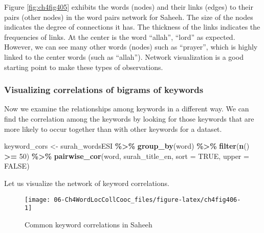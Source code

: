 \documentclass[
]{article}
\newenvironment{Shaded}{\begin{snugshade}}{\end{snugshade}}
\newcommand{\AttributeTok}[1]{\textcolor[rgb]{0.13,0.29,0.53}{#1}}
\newcommand{\ConstantTok}[1]{\textcolor[rgb]{0.56,0.35,0.01}{#1}}
\newcommand{\DecValTok}[1]{\textcolor[rgb]{0.00,0.00,0.81}{#1}}
\newcommand{\FunctionTok}[1]{\textcolor[rgb]{0.13,0.29,0.53}{\textbf{#1}}}
\newcommand{\NormalTok}[1]{#1}
\newcommand{\OtherTok}[1]{\textcolor[rgb]{0.56,0.35,0.01}{#1}}
\newcommand{\SpecialCharTok}[1]{\textcolor[rgb]{0.81,0.36,0.00}{\textbf{#1}}}
\begin{document}
Figure \ref{fig:ch4fig405} exhibits the words (nodes) and their links (edges) to their pairs (other nodes) in the word pairs network for Saheeh. The size of the nodes indicates the degree of connections it has. The thickness of the links indicates the frequencies of links. At the center is the word ``allah'', ``lord'' as expected. However, we can see many other words (nodes) such as ``prayer'', which is highly linked to the center words (such as ``allah''). Network visualization is a good starting point to make these types of observations.

\hypertarget{visualizing-correlations-of-bigrams-of-keywords}{%
\subsubsection{Visualizing correlations of bigrams of keywords}\label{visualizing-correlations-of-bigrams-of-keywords}}

Now we examine the relationships among keywords in a different way. We can find the correlation among the keywords by looking for those keywords that are more likely to occur together than with other keywords for a dataset.

\footnotesize

\begin{Shaded}
\begin{Highlighting}[]
\NormalTok{keyword\_cors }\OtherTok{\textless{}{-}}\NormalTok{ surah\_wordsESI }\SpecialCharTok{\%\textgreater{}\%} 
  \FunctionTok{group\_by}\NormalTok{(word) }\SpecialCharTok{\%\textgreater{}\%}
  \FunctionTok{filter}\NormalTok{(}\FunctionTok{n}\NormalTok{() }\SpecialCharTok{\textgreater{}=} \DecValTok{50}\NormalTok{) }\SpecialCharTok{\%\textgreater{}\%}
  \FunctionTok{pairwise\_cor}\NormalTok{(word, surah\_title\_en, }\AttributeTok{sort =} \ConstantTok{TRUE}\NormalTok{, }\AttributeTok{upper =} \ConstantTok{FALSE}\NormalTok{)}
\end{Highlighting}
\end{Shaded}

\normalsize

Let us visualize the network of keyword correlations.

\begin{figure}

{\centering \texttt{[image: 06-Ch4WordLocCollCooc\_files/figure-latex/ch4fig406-1]} 

}

\caption{Common keyword correlations in Saheeh}\label{fig:ch4fig406}
\end{figure}
\end{document}
